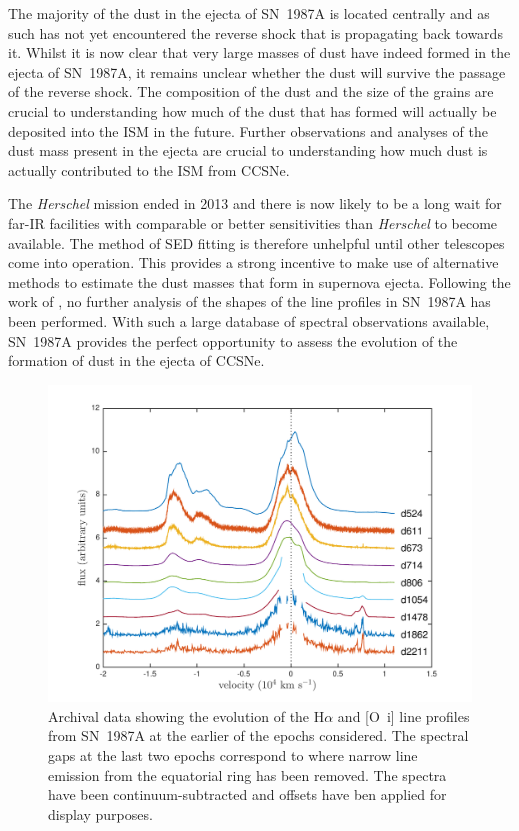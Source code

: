 The majority of the dust in the ejecta of SN~1987A is located centrally and as such has not yet encountered the reverse shock that is propagating back towards it.  Whilst it is now clear that very large masses of dust have indeed formed in the ejecta of SN~1987A, it remains unclear whether the dust will survive the passage of the reverse shock.  The composition of the dust and the size of the grains are crucial to understanding how much of the dust that has formed will actually be deposited into the ISM in the future.  Further observations and analyses of the dust mass present in the ejecta are  crucial to understanding how much dust is actually contributed to the ISM from CCSNe.




The {\em Herschel} mission ended in 2013 and there is now likely to be a long wait for far-IR facilities with comparable or better sensitivities than {\em Herschel} to become available.  The method of SED fitting is therefore unhelpful until other telescopes come into operation.  This provides a strong incentive to make use of alternative methods to estimate the dust masses that form in supernova ejecta.  Following the work of \citet{Lucy1989}, no further analysis of the shapes of the line profiles in SN~1987A has been performed.  With such a large database of spectral observations available, SN~1987A provides the perfect opportunity to assess the evolution of the formation of dust in the ejecta of CCSNe.  

\begin{figure}
\centering
\includegraphics[trim =39 10 45 15,clip=true,scale=0.7]{chapters/chapter5/images/Ha_evol_early_1col2.pdf}
\caption{Archival data showing the evolution of the H$\alpha$ and
[O~{\sc i}] line profiles from SN~1987A at the earlier of the epochs considered. The 
spectral gaps at the last two epochs correspond to where narrow line 
emission from the equatorial ring has been removed. The spectra have been
continuum-subtracted and offsets have ben applied for display purposes.}
\label{Ha_evol_early}
\end{figure}

